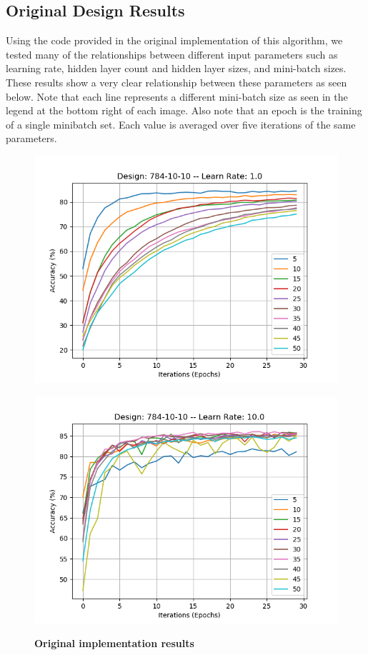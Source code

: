 \documentclass[12pt]{article}
\theoremstyle{definition}
\theoremstyle{plain}
\begin{document}
\subsection{Original Design Results}
Using the code provided in the original implementation of this algorithm, we tested many of the relationships between different input parameters such as learning rate, hidden layer count and hidden layer sizes, and mini-batch sizes. These results show a very clear relationship between these parameters as seen below. Note that each line represents a different mini-batch size as seen in the legend at the bottom right of each image. Also note that an epoch is the training of a single minibatch set. Each value is averaged over five iterations of the same parameters. 
\begin{figure}
	\begin{minipage}{\linewidth}
	\centering\captionsetup[subfigure]{justification=centering}
	\includegraphics[width=\textwidth]{Images/Original/lr1.png}
	\subcaption{}
	\label{fig:LR1}\par\vfill
	\includegraphics[width=\textwidth]{Images/Original/lr10.png}
	\subcaption{}
	\label{fig:LR10}\par\vfill
	\end{minipage}
\caption{\textbf{Original implementation results}}\label{fig:original}
\end{figure}
\end{document}
